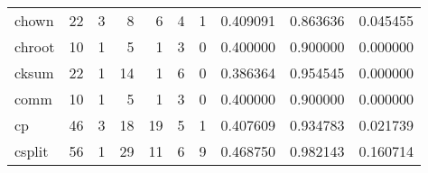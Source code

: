 \begin{tabular}{lrrrrrrrrr}
chown     &                                       22 &                                                  3 &                                                  8 &                                                  6 &                                                  4 &                                                  1 &                                           0.409091 &                               0.863636 &                             0.045455 \\
chroot    &                                       10 &                                                  1 &                                                  5 &                                                  1 &                                                  3 &                                                  0 &                                           0.400000 &                               0.900000 &                             0.000000 \\
cksum     &                                       22 &                                                  1 &                                                 14 &                                                  1 &                                                  6 &                                                  0 &                                           0.386364 &                               0.954545 &                             0.000000 \\
comm      &                                       10 &                                                  1 &                                                  5 &                                                  1 &                                                  3 &                                                  0 &                                           0.400000 &                               0.900000 &                             0.000000 \\
cp        &                                       46 &                                                  3 &                                                 18 &                                                 19 &                                                  5 &                                                  1 &                                           0.407609 &                               0.934783 &                             0.021739 \\
csplit    &                                       56 &                                                  1 &                                                 29 &                                                 11 &                                                  6 &                                                  9 &                                           0.468750 &                               0.982143 &                             0.160714 \\

\end{tabular}
